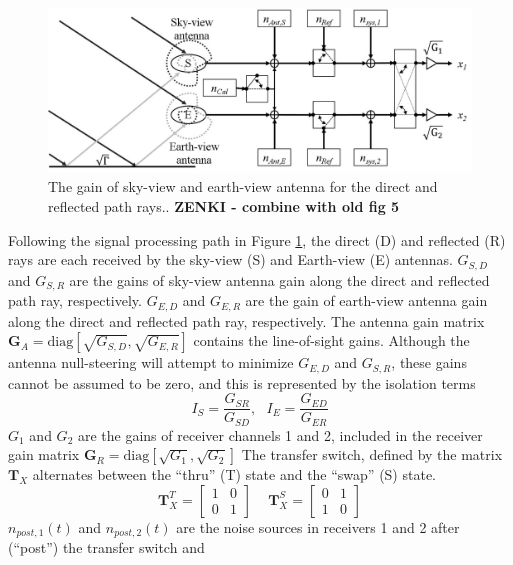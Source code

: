 \documentclass[draftcls,onecolumn]{IEEEtran}  %
\begin{document}
\begin{figure}[t!]
	\centering
    \centering
	\includegraphics[width=5 in]{pdf/flow_chart_combine.jpg}
	\caption{The gain of sky-view and earth-view antenna for the direct and reflected path rays.. \bf ZENKI - combine with old fig 5 \rm}
	\label{fig:Hardware}
\end{figure}
Following the signal processing path  in Figure \ref{fig:Hardware}, the direct (D) and reflected (R) rays are each received by the sky-view (S) and Earth-view (E) antennas. 
 $G_{S,D}$ and $G_{S,R}$ are the gains of sky-view antenna gain along the direct and reflected path ray, respectively. 
 $G_{E,D}$ and $G_{E,R}$ are the gain of earth-view antenna gain along the direct and reflected path ray, respectively. 
 The antenna gain matrix  $\mathbf{G}_A = \mathrm{diag} [ \sqrt{G_{S,D}}, \sqrt{G_{E,R}}]$ contains the  line-of-sight gains. 
 Although the antenna null-steering will attempt to minimize $G_{E,D}$ and $G_{S,R}$, these gains cannot be assumed to be zero, and this is represented by the 
  isolation terms
\begin{equation}
    I_S  = \frac{G_{SR}}{G_{SD}},  \,\,\,\,
   I_E = \frac{G_{ED}}{G_{ER}}
\end{equation}
$G_1$ and $G_2$ are the gains of receiver channels 1 and 2, included in the receiver gain matrix $\mathbf{G}_R = \mathrm{diag} [ \sqrt{G_{1}}, \sqrt{G_{2}}]$
The transfer switch, defined by the matrix $\mathbf{T}_X$ alternates between the ``thru'' (T)  state and the ``swap'' (S) state. 
\begin{equation}
\mathbf{T}^T_X = \left[ \begin{array}{cc} 1 &  0 \\ 0 & 1 \end{array} \right] \,\,\,\,\,\,\,
 \mathbf{T}^S_X = \left[ \begin{array}{cc} 0 &  1 \\ 1 & 0 \end{array} \right]
\end{equation}
$n_{post,1}(t)$ and $n_{post,2}(t)$ are the noise sources in receivers 1 and 2  after (``post'')  the transfer switch and 
\end{document}
